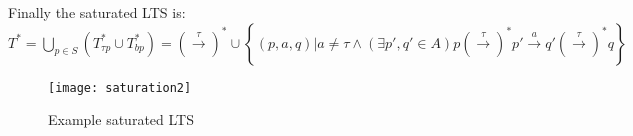 Finally the saturated LTS is:\\
$T^{*}=\bigcup_{p\in S}\left(T^{*}_{\tau p}\cup T^{*}_{bp}\right)=\left(\stackrel{\tau}{\rightarrow}\right)^{*}\cup\left\{\left(p,a,q\right)|a\neq\tau\wedge\left(\exists p',q'\in A\right) p\left(\stackrel{\tau}{\rightarrow}\right)^{*}p'\stackrel{a}{\rightarrow}q'\left(\stackrel{\tau}{\rightarrow}\right)^{*}q\right\}$

\begin{figure}[!ht]
\centering
\texttt{[image: saturation2]}
\caption{Example saturated LTS}
\label{fig:saturation2}
\end{figure}